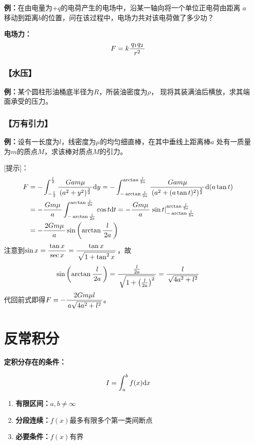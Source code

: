 {\bf 例：}在由电量为$+q$的电荷产生的电场中，沿某一轴向将一个单位正电荷由距离
$a$移动到距离$b$的位置，问在该过程中，电场力共对该电荷做了多少功？

{\bf 电场力：}
$$F=k\displaystyle\frac{\,{q_1q_2}\,}{\,{r^2}\,}$$

\subsubsection{【水压】}

{\bf 例：}某个圆柱形油桶底半径为$R$，所装油密度为$\rho$，
现将其装满油后横放，求其端面承受的压力。

\subsubsection{【万有引力】}

{\bf 例：}设有一长度为$l$，线密度为$\mu$的均匀细直棒，在其中垂线上距离棒$a$
处有一质量为$m$的质点$M$，求该棒对质点$M$的引力。

[提示]：
\begin{align}
	F&=-\displaystyle\int_{-\frac l2}^{\frac l2}\displaystyle\frac{\,{Gam\mu}\,}{\,{(a^2+y^2)^{\frac32}}\,}\mathrm{d} y
	=-\displaystyle\int_{-\arctan\frac l{2a}}^{\arctan\frac l{2a}}\displaystyle\frac{\,{Gam\mu}\,}{\,{(a^2+(a\tan
	t)^2)^{\frac32}}\,}\mathrm{d} (a\tan t)\notag\\
	&=-\displaystyle\frac{\,{Gm\mu}\,}{\,{a}\,}\displaystyle\int_{-\arctan\frac l{2a}}^{\arctan\frac
	l{2a}}\cos t\mathrm{d} t=-\displaystyle\frac{\,{Gm\mu}\,}{\,{a}\,}\left.\sin t\right|_{-\arctan\frac
	l{2a}}^{\arctan\frac l{2a}}\notag\\
	&=-\displaystyle\frac{\,{2Gm\mu}\,}{\,{a}\,}\sin\left(\arctan\displaystyle\frac{\,{l}\,}{\,{2a}\,}\right)\notag
\end{align}
注意到$\sin x=\displaystyle\frac{\,{\tan x}\,}{\,{\sec x}\,}=\displaystyle\frac{\,{\tan x}\,}{\,{\sqrt{1+\tan^2 x}}\,}$，故
$$\sin\left(\arctan\displaystyle\frac{\,{l}\,}{\,{2a}\,}\right)=\displaystyle\frac{\,{\frac{l}{2a}}\,}{\,{\sqrt{1+\left(\frac{l}{2a}\right)^2}}\,}=\displaystyle\frac{\,{l}\,}{\,{\sqrt{4a^2+l^2}}\,}$$
代回前式即得$F=-\displaystyle\frac{\,{2Gm\mu l}\,}{\,{a\sqrt{4a^2+l^2}}\,}$。

\section{反常积分}

{\bf 定积分存在的条件：}

$${I=\displaystyle\int_a^bf(x)\mathrm{d} x}$$

\begin{enumerate} [(1)]
  \setlength{\itemindent}{1cm}
  \item {\bf 有限区间：}$a,b\ne \infty$
  \item {\bf 分段连续：}$f(x)$最多有限多个第一类间断点 
  \item {\bf 必要条件：}$f(x)$有界
\end{enumerate}

